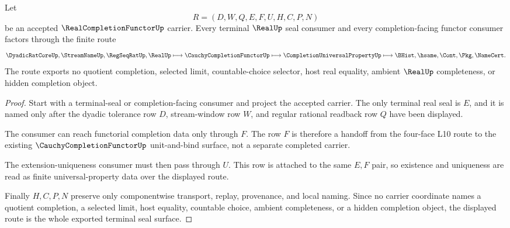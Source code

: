 \begin{theorem}
\label{thm:real-completion-functor-terminal-seal-nonescape}
Let
$$
R=(D,W,Q,E,F,U,H,C,P,N)
$$
be an accepted $\RealCompletionFunctorUp$ carrier. Every terminal $\RealUp$ seal consumer and every completion-facing functor consumer factors through the finite route
$$
\DyadicRatCoreUp,\StreamNameUp,\RegSeqRatUp,\RealUp
\longmapsto
\CauchyCompletionFunctorUp
\longmapsto
\CompletionUniversalPropertyUp
\longmapsto
\BHist,\hsame,\Cont,\Pkg,\NameCert .
$$
The route exports no quotient completion, selected limit, countable-choice selector, host real equality, ambient $\RealUp$ completeness, or hidden completion object.
\end{theorem}
\begin{proof}
Start with a terminal-seal or completion-facing consumer and project the accepted carrier. The only terminal real seal is $E$, and it is named only after the dyadic tolerance row $D$, stream-window row $W$, and regular rational readback row $Q$ have been displayed.

The consumer can reach functorial completion data only through $F$. The row $F$ is therefore a handoff from the four-face L10 route to the existing $\CauchyCompletionFunctorUp$ unit-and-bind surface, not a separate completed carrier.

The extension-uniqueness consumer must then pass through $U$. This row is attached to the same $E,F$ pair, so existence and uniqueness are read as finite universal-property data over the displayed route.

Finally $H,C,P,N$ preserve only componentwise transport, replay, provenance, and local naming. Since no carrier coordinate names a quotient completion, a selected limit, host equality, countable choice, ambient completeness, or a hidden completion object, the displayed route is the whole exported terminal seal surface.
\end{proof}

